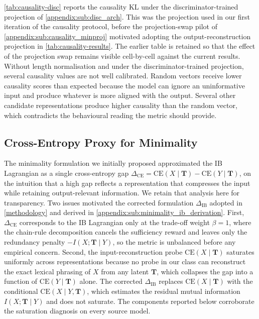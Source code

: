 \cref{tab:causality-disc} reports the causality KL under the discriminator-trained projection of \cref{appendix:sub:disc_arch}. This was the projection used in our first iteration of the causality protocol, before the projection-swap pilot of \cref{appendix:sub:causality_minproj} motivated adopting the output-reconstruction projection in \cref{tab:causality-results}. The earlier table is retained so that the effect of the projection swap remains visible cell-by-cell against the current results. Without length normalisation and under the discriminator-trained projection, several causality values are not well calibrated. Random vectors receive lower causality scores than expected because the model can ignore an uninformative input and produce whatever is more aligned with the output. Several other candidate representations produce higher causality than the random vector, which contradicts the behavioural reading the metric should provide.



\subsection{Cross-Entropy Proxy for Minimality}
\label{appendix:minimality-components}

The minimality formulation we initially proposed approximated the IB Lagrangian as a single cross-entropy gap $\Delta_{\text{CE}} = \text{CE}(X \mid \mathbf{T}) - \text{CE}(Y \mid \mathbf{T})$, on the intuition that a high gap reflects a representation that compresses the input while retaining output-relevant information. We retain that analysis here for transparency. Two issues motivated the corrected formulation $\Delta_{\text{IB}}$ adopted in \cref{methodology} and derived in \cref{appendix:sub:minimality_ib_derivation}. First, $\Delta_{\text{CE}}$ corresponds to the IB Lagrangian only at the trade-off weight $\beta = 1$, where the chain-rule decomposition cancels the sufficiency reward and leaves only the redundancy penalty $-I(X; \mathbf{T} \mid Y)$, so the metric is unbalanced before any empirical concern. Second, the input-reconstruction probe $\text{CE}(X \mid \mathbf{T})$ saturates uniformly across representations because no probe in our class can reconstruct the exact lexical phrasing of $X$ from any latent $\mathbf{T}$, which collapses the gap into a function of $\text{CE}(Y \mid \mathbf{T})$ alone. The corrected $\Delta_{\text{IB}}$ replaces $\text{CE}(X \mid \mathbf{T})$ with the conditional $\text{CE}(X \mid Y, \mathbf{T})$, which estimates the residual mutual information $I(X; \mathbf{T} \mid Y)$ and does not saturate. The components reported below corroborate the saturation diagnosis on every source model.

